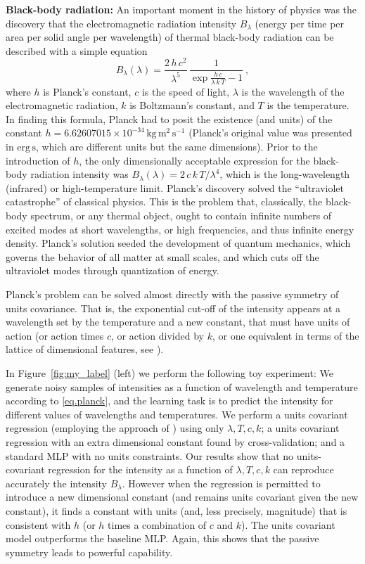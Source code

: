 \documentclass{article}
\theoremstyle{plain}
\theoremstyle{definition}
\theoremstyle{remark}
\newcommand{\figref}[1]{Figure~\ref{#1}}
\newcommand{\unit}[1]{\mathrm{#1}}
\newcommand{\kg}{\unit{kg}}
\newcommand{\m}{\unit{m}}
\newcommand{\s}{\unit{s}}
\begin{document}
\textbf{Black-body radiation:}
An important moment in the history of physics was the discovery that the electromagnetic radiation intensity $B_\lambda$ (energy per time per area per solid angle per wavelength) of thermal black-body radiation can be described with a simple equation \cite{planck}
\begin{equation} \label{eq.planck}
    B_\lambda(\lambda) = \frac{2\,h\,c^2}{\lambda^5}\,\frac{1}{\exp\frac{h\,c}{\lambda\,k\,T} - 1}~,
\end{equation}
where $h$ is Planck's constant,
$c$ is the speed of light,
$\lambda$ is the wavelength of the electromagnetic radiation,
$k$ is Boltzmann's constant,
and $T$ is the temperature.
In finding this formula, Planck had to posit the existence (and units) of the constant $h=6.62607015\times 10^{-34}\,\kg\,\m^2\,\s^{-1}$ (Planck's original value was presented in $\mathrm{erg}\,\s$, which are different units but the same dimensions).
Prior to the introduction of $h$, the only dimensionally acceptable expression for the black-body radiation intensity was $B_\lambda(\lambda)=2\,c\,k\,T/\lambda^4$, which is the long-wavelength (infrared) or high-temperature limit.
Planck's discovery solved the ``ultraviolet catastrophe'' of classical physics.
This is the problem that, classically, the black-body spectrum, or any thermal object, ought to contain infinite numbers of excited modes at short wavelengths, or high frequencies, and thus infinite energy density.
Planck's solution seeded the development of quantum mechanics, which governs the behavior of all matter at small scales, and which cuts off the ultraviolet modes through quantization of energy.

Planck's problem can be solved almost directly with the passive symmetry of units covariance.
That is, the exponential cut-off of the intensity appears at a wavelength set by the temperature and a new constant, that must have units of action (or action times $c$, or action divided by $k$, or one equivalent in terms of the lattice of dimensional features, see \citealt{villar2022dimensionless}).

In \figref{fig:my_label} (left) we perform the following toy experiment:
We generate noisy samples of intensities as a function of wavelength and temperature according to \eqref{eq.planck}, and the learning task is to predict the intensity for different values of wavelengths and temperatures.
We perform a units covariant regression (employing the approach of \citealt{villar2022dimensionless}) using only $\lambda, T, c, k$; a units covariant regression with an extra dimensional constant found by cross-validation; and a standard MLP with no units constraints.
Our results show that no units-covariant regression for the intensity as a function of $\lambda, T, c, k$ can reproduce accurately the intensity $B_\lambda$. However when the regression is permitted to introduce a new dimensional constant (and remains units covariant given the new constant), it finds a constant with units (and, less precisely, magnitude) that is consistent with $h$ (or $h$ times a combination of $c$ and $k$). The units covariant model outperforms the baseline MLP. Again, this shows that the passive symmetry leads to powerful capability.
\end{document}
